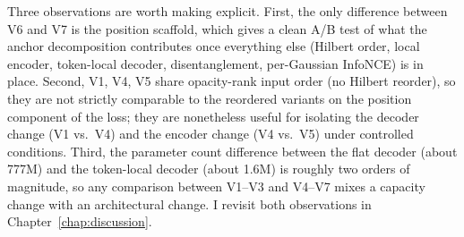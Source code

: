 Three observations are worth making explicit. First, the only difference between V6 and V7 is the position scaffold, which gives a clean A/B test of what the anchor decomposition contributes once everything else (Hilbert order, local encoder, token-local decoder, disentanglement, per-Gaussian InfoNCE) is in place. Second, V1, V4, V5 share opacity-rank input order (no Hilbert reorder), so they are not strictly comparable to the reordered variants on the position component of the loss; they are nonetheless useful for isolating the decoder change (V1 vs.\ V4) and the encoder change (V4 vs.\ V5) under controlled conditions. Third, the parameter count difference between the flat decoder (about 777M) and the token-local decoder (about 1.6M) is roughly two orders of magnitude, so any comparison between V1--V3 and V4--V7 mixes a capacity change with an architectural change. I revisit both observations in Chapter~\ref{chap:discussion}.